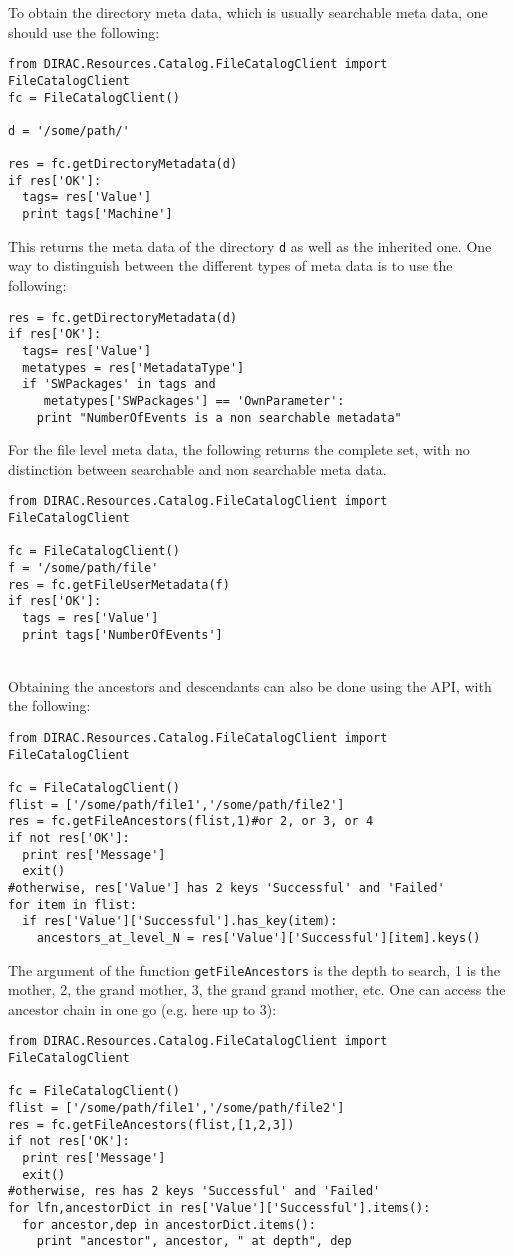 \documentclass[11pt,a4paper]{scrartcl}
\begin{document}
To obtain the directory meta data, which is usually searchable meta data, one
should use the following:
\begin{lstlisting}
from DIRAC.Resources.Catalog.FileCatalogClient import FileCatalogClient
fc = FileCatalogClient()

d = '/some/path/' 

res = fc.getDirectoryMetadata(d)
if res['OK']:   
  tags= res['Value']
  print tags['Machine']
\end{lstlisting}
This returns the meta data of the directory \lstinline|d| as well as the
inherited one. One way to distinguish between the different types of meta data
is to use the following:
\begin{lstlisting}
res = fc.getDirectoryMetadata(d)
if res['OK']:   
  tags= res['Value']
  metatypes = res['MetadataType']
  if 'SWPackages' in tags and 
     metatypes['SWPackages'] == 'OwnParameter':
    print "NumberOfEvents is a non searchable metadata"
\end{lstlisting}

For the file level meta data, the following returns the complete set, with no
distinction between searchable and non searchable meta data.
\begin{lstlisting}
from DIRAC.Resources.Catalog.FileCatalogClient import FileCatalogClient

fc = FileCatalogClient()
f = '/some/path/file'
res = fc.getFileUserMetadata(f)
if res['OK']:   
  tags = res['Value']
  print tags['NumberOfEvents']
\end{lstlisting}

~\\

Obtaining the ancestors and descendants can also be done using the API, with the
following:
\begin{lstlisting}
from DIRAC.Resources.Catalog.FileCatalogClient import FileCatalogClient

fc = FileCatalogClient()
flist = ['/some/path/file1','/some/path/file2']
res = fc.getFileAncestors(flist,1)#or 2, or 3, or 4
if not res['OK']:
  print res['Message']
  exit()
#otherwise, res['Value'] has 2 keys 'Successful' and 'Failed'  
for item in flist:
  if res['Value']['Successful'].has_key(item):
    ancestors_at_level_N = res['Value']['Successful'][item].keys()
\end{lstlisting}
The argument of the function \lstinline|getFileAncestors| is the depth to
search, 1 is the mother, 2, the grand mother, 3, the grand grand mother, etc. One can access the ancestor chain
in one go (e.g. here up to 3):
\begin{lstlisting}
from DIRAC.Resources.Catalog.FileCatalogClient import FileCatalogClient

fc = FileCatalogClient()
flist = ['/some/path/file1','/some/path/file2']
res = fc.getFileAncestors(flist,[1,2,3])
if not res['OK']:
  print res['Message']
  exit()
#otherwise, res has 2 keys 'Successful' and 'Failed'  
for lfn,ancestorDict in res['Value']['Successful'].items():
  for ancestor,dep in ancestorDict.items():
    print "ancestor", ancestor, " at depth", dep
\end{lstlisting}
\end{document}
